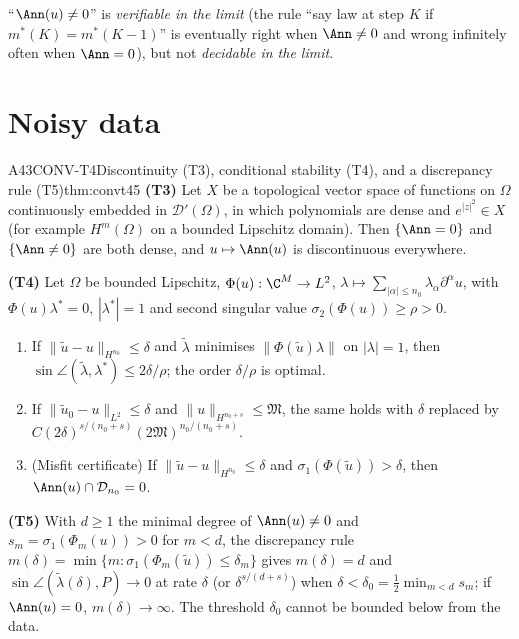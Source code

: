 \begin{caution}[title=Reading]
``$\Ann(u)\ne0$'' is \emph{verifiable in the limit} (the rule ``say law at step $K$ if $m^*(K)=m^*(K-1)$'' is eventually right when $\Ann\ne0$ and wrong infinitely often when $\Ann=0$), but not \emph{decidable in the limit}.
\end{caution}

\section{Noisy data}

\begin{dimcard}{A43}{CONV-T4}{Discontinuity (T3), conditional stability (T4), and a discrepancy rule (T5)}{\proved}{thm:convt45}
\textbf{(T3)} Let $X$ be a topological vector space of functions on $\Omega$ continuously embedded in $\mathcal D'(\Omega)$, in which polynomials are dense and $e^{|z|^2}\in X$ (for example $H^m(\Omega)$ on a bounded Lipschitz domain). Then $\{\Ann=0\}$ and $\{\Ann\ne0\}$ are both dense, and $u\mapsto\Ann(u)$ is discontinuous everywhere.

\textbf{(T4)} Let $\Omega$ be bounded Lipschitz, $\Phi(u):\C^M\to L^2$, $\lambda\mapsto\sum_{|\alpha|\le n_0}\lambda_\alpha\partial^\alpha u$, with $\Phi(u)\lambda^*=0$, $|\lambda^*|=1$ and second singular value $\sigma_2(\Phi(u))\ge\rho>0$.
\begin{enumerate}[label=(\alph*)]
\item If $\|\tilde u-u\|_{H^{n_0}}\le\delta$ and $\tilde\lambda$ minimises $\|\Phi(\tilde u)\lambda\|$ on $|\lambda|=1$, then $\sin\angle(\tilde\lambda,\lambda^*)\le2\delta/\rho$; the order $\delta/\rho$ is optimal.
\item If $\|\tilde u_0-u\|_{L^2}\le\delta$ and $\|u\|_{H^{n_0+s}}\le\mathfrak M$, the same holds with $\delta$ replaced by $C(2\delta)^{s/(n_0+s)}(2\mathfrak M)^{n_0/(n_0+s)}$.
\item (Misfit certificate) If $\|\tilde u-u\|_{H^{n_0}}\le\delta$ and $\sigma_1(\Phi(\tilde u))>\delta$, then $\Ann(u)\cap\mathcal D_{n_0}=0$.
\end{enumerate}

\textbf{(T5)} With $d\ge1$ the minimal degree of $\Ann(u)\ne0$ and $s_m=\sigma_1(\Phi_m(u))>0$ for $m<d$, the discrepancy rule $m(\delta)=\min\{m:\sigma_1(\Phi_m(\tilde u))\le\delta_m\}$ gives $m(\delta)=d$ and $\sin\angle(\tilde\lambda(\delta),P)\to0$ at rate $\delta$ (or $\delta^{s/(d+s)}$) when $\delta<\delta_0=\tfrac12\min_{m<d}s_m$; if $\Ann(u)=0$, $m(\delta)\to\infty$. The threshold $\delta_0$ cannot be bounded below from the data.
\end{dimcard}

